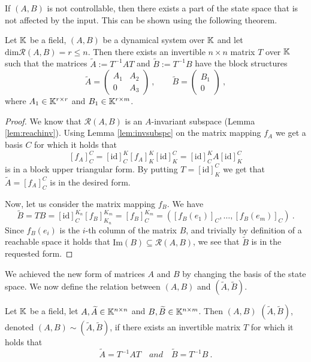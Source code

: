 If $(A,B)$ is not controllable, then there exists a part of the state space that is not affected by the input. This can be shown using the following theorem.

\begin{theorem}
	\label{theorem:decomp}
	Let $\mathbb{K}$ be a field, $(A,B)$ be a dynamical system over $\mathbb{K}$ and let $\text{dim}\mathcal{R}(A,B)=r\leq n$. Then there exists an invertible $n\times n$ matrix $T$ over $\mathbb{K}$ such that the matrices $\widetilde{A}:=T^{-1}AT$ and $\widetilde{B}:=T^{-1}B$ have the block structures 
	\begin{equation}
		\label{eq:decomp}
		\widetilde{A}=
		\begin{pmatrix}
			A_1 & A_2 \\
			0   & A_3 
		\end{pmatrix}
		\ , \qquad
		\widetilde{B}=
		\begin{pmatrix}
			B_1  \\
			0
		\end{pmatrix}\ ,
	\end{equation}
	where $A_1\in\mathbb{K}^{r \times r}$ and $B_1\in\mathbb{K}^{r \times m}$.
\end{theorem}

\begin{proof}
	We know that $\mathcal{R}(A,B)$ is an $A$-invariant subspace (Lemma \ref{lem:reachinv}). Using Lemma \ref{lem:invsubspc} on the matrix mapping $f_A$ we get a basis $C$ for which it holds that 
	$$[f_A]^C_C=[\text{id}]^K_C[f_A]^K_K[\text{id}]^C_K=[\text{id}]^K_CA[\text{id}]^C_K$$ 
	is in a block upper triangular form. By putting $T=[\text{id}]^C_K$ we get that $\widetilde{A}=[f_A]^C_C$ is in the desired form.

	Now, let us consider the matrix mapping $f_B$. We have
	$$\widetilde{B}=TB=[\text{id}]^{K_n}_C[f_B]^{K_m}_{K_n}=[f_B]^{K_m}_C=([f_B(e_1)]_C,\ldots,[f_B(e_m)]_C)\ .$$
	Since $f_B(e_i)$ is the $i$-th column of the matrix $B$, and trivially by definition of a reachable space it holds that $\text{Im}(B)\subseteq \mathcal{R}(A,B)$, we see that $\widetilde{B}$ is in the requested form.
\end{proof}

We achieved the new form of matrices $A$ and $B$ by changing the basis of the state space. We now define the relation between $(A,B)$ and $(\widetilde{A},\widetilde{B}).$

\begin{definition}
	Let $\mathbb{K}$ be a field, let $A,\widetilde{A}\in\mathbb{K}^{n\times n}$ and $B,\widetilde{B}\in \mathbb{K}^{n\times m}$. Then $(A,B)$  $(\widetilde{A},\widetilde{B})$, denoted $(A,B) \sim (\widetilde{A},\widetilde{B})$, if there exists an invertible matrix $T$ for which it holds that
	$$\widetilde{A}=T^{-1}AT\quad and\quad\widetilde{B}=T^{-1}B\ .$$
\end{definition}

